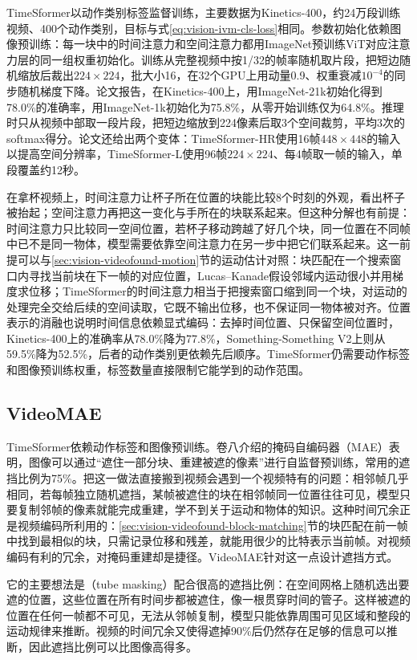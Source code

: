 TimeSformer以动作类别标签监督训练，主要数据为Kinetics-400，约24万段训练视频、400个动作类别，目标与式\eqref{eq:vision-ivm-cls-loss}相同。参数初始化依赖图像预训练：每一块中的时间注意力和空间注意力都用ImageNet预训练ViT对应注意力层的同一组权重初始化。训练从完整视频中按1/32的帧率随机取片段，把短边随机缩放后裁出$224\times224$，批大小16，在32个GPU上用动量0.9、权重衰减$10^{-4}$的同步随机梯度下降。论文报告，在Kinetics-400上，用ImageNet-21k初始化得到78.0\%的准确率，用ImageNet-1k初始化为75.8\%，从零开始训练仅为64.8\%。推理时只从视频中部取一段片段，把短边缩放到224像素后取3个空间裁剪，平均3次的softmax得分。论文还给出两个变体：TimeSformer-HR使用16帧$448\times448$的输入以提高空间分辨率，TimeSformer-L使用96帧$224\times224$、每4帧取一帧的输入，单段覆盖约12秒。

在拿杯视频上，时间注意力让杯子所在位置的块能比较8个时刻的外观，看出杯子被抬起；空间注意力再把这一变化与手所在的块联系起来。但这种分解也有前提：时间注意力只比较同一空间位置，若杯子移动跨越了好几个块，同一位置在不同帧中已不是同一物体，模型需要依靠空间注意力在另一步中把它们联系起来。这一前提可以与\ref{sec:vision-videofound-motion}节的运动估计对照：块匹配在一个搜索窗口内寻找当前块在下一帧的对应位置，Lucas--Kanade假设邻域内运动很小并用梯度求位移；TimeSformer的时间注意力相当于把搜索窗口缩到同一个块，对运动的处理完全交给后续的空间读取，它既不输出位移，也不保证同一物体被对齐。位置表示的消融也说明时间信息依赖显式编码：去掉时间位置、只保留空间位置时，Kinetics-400上的准确率从78.0\%降为77.8\%，Something-Something V2上则从59.5\%降为52.5\%，后者的动作类别更依赖先后顺序。TimeSformer仍需要动作标签和图像预训练权重，标签数量直接限制它能学到的动作范围。

\subsection{VideoMAE}
\label{sec:vision-ivm-videomae}

TimeSformer依赖动作标签和图像预训练。卷八介绍的掩码自编码器（MAE）表明，图像可以通过“遮住一部分块、重建被遮的像素”进行自监督预训练，常用的遮挡比例为75\%。把这一做法直接搬到视频会遇到一个视频特有的问题：相邻帧几乎相同，若每帧独立随机遮挡，某帧被遮住的块在相邻帧同一位置往往可见，模型只要复制邻帧的像素就能完成重建，学不到关于运动和物体的知识。这种时间冗余正是视频编码所利用的：\ref{sec:vision-videofound-block-matching}节的块匹配在前一帧中找到最相似的块，只需记录位移和残差，就能用很少的比特表示当前帧。对视频编码有利的冗余，对掩码重建却是捷径。VideoMAE针对这一点设计遮挡方式。

它的主要想法是（tube masking）配合很高的遮挡比例：在空间网格上随机选出要遮的位置，这些位置在所有时间步都被遮住，像一根贯穿时间的管子。这样被遮的位置在任何一帧都不可见，无法从邻帧复制，模型只能依靠周围可见区域和整段的运动规律来推断。视频的时间冗余又使得遮掉90\%后仍然存在足够的信息可以推断，因此遮挡比例可以比图像高得多。


